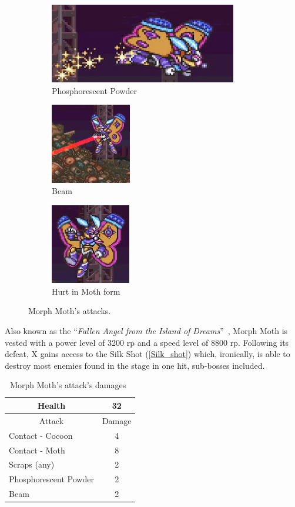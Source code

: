 \begin{figure}[htp]
	\ContinuedFloat
	\centering
	\begin{subfigure}{\linewidth}
		\centering
		\includegraphics[height=3.5cm]{figures/X2/Morph_moth/Moth_powder.jpg}
		\caption{Phosphorescent Powder}
	\end{subfigure}
	\begin{subfigure}{0.3\linewidth}
		\centering
		\includegraphics[height=3.5cm]{figures/X2/Morph_moth/Moth_beam.png}
		\caption{Beam}
	\end{subfigure}
	\begin{subfigure}{0.3\linewidth}
		\centering
		\includegraphics[height=3.5cm]{figures/X2/Morph_moth/Moth_hurt.jpg}
		\caption{Hurt in Moth form}
	\end{subfigure}
	\caption{Morph Moth's attacks.}
\end{figure}

Also known as the ``\textit{Fallen Angel from the Island of Dreams}''~\cite{book:MMX_Complete_art}, Morph Moth is vested with a power level of 3200 rp and a speed level of 8800 rp. Following its defeat, X gains access to the Silk Shot (\ref{Silk_shot}) which, ironically, is able to destroy most enemies found in the stage in one hit, sub-bosses included.


\begin{table}[htp]
	\centering
	\begin{tabular}[h]{l c}
		
		\toprule
		\multicolumn{1}{c}{Health}  & 32 \\
		\midrule
		\multicolumn{1}{c}{Attack} & \multicolumn{1}{c}{Damage}\\
		Contact - Cocoon & 4 \\
		Contact - Moth& 8\\
		Scraps (any) & 2\\
		Phosphorescent Powder& 2\\
		Beam & 2\\
		\bottomrule
	\end{tabular}
	\caption{Morph Moth's attack's damages~\cite{wiki:Morph_moth}}
\end{table}

